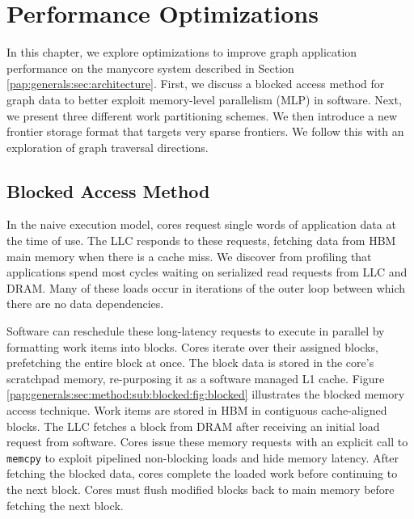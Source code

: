 \chapter{Performance Optimizations}\label{gen:sec:optimizations}



In this chapter, we explore optimizations to improve graph application performance on the manycore system described in Section \ref{pap:generals:sec:architecture}.
First, we discuss a blocked access method for graph data to better exploit memory-level parallelism (MLP) in software.
Next, we present three different work partitioning schemes.
We then introduce a new frontier storage format that targets very sparse frontiers. 
We follow this with an exploration of graph traversal directions.

\section{Blocked Access Method}\label{sec:method:sub:blocked}
In the naive execution model, cores request single words of application data at the time of use.
The LLC responds to these requests, fetching data from HBM main memory when there is a cache miss.
We discover from profiling that applications spend most cycles waiting on serialized read requests from LLC and DRAM.
Many of these loads occur in iterations of the outer loop between which there are no data dependencies.

\blockedMethodFigure

Software can reschedule these long-latency requests to execute in parallel by formatting work items into blocks.
Cores iterate over their assigned blocks, prefetching the entire block at once.
The block data is stored in the core's scratchpad memory, re-purposing it as a software managed L1 cache.
Figure \ref{pap:generals:sec:method:sub:blocked:fig:blocked} illustrates the blocked memory access technique. 
Work items are stored in HBM in contiguous cache-aligned blocks.
The LLC fetches a block from DRAM after receiving an initial load request from software.
Cores issue these memory requests with an explicit call to \lstinline[language=C++, basicstyle=\small\ttfamily]{memcpy} to exploit pipelined non-blocking loads and hide memory latency.
After fetching the blocked data, cores complete the loaded work before continuing to the next block.
Cores must flush modified blocks back to main memory before fetching the next block.


